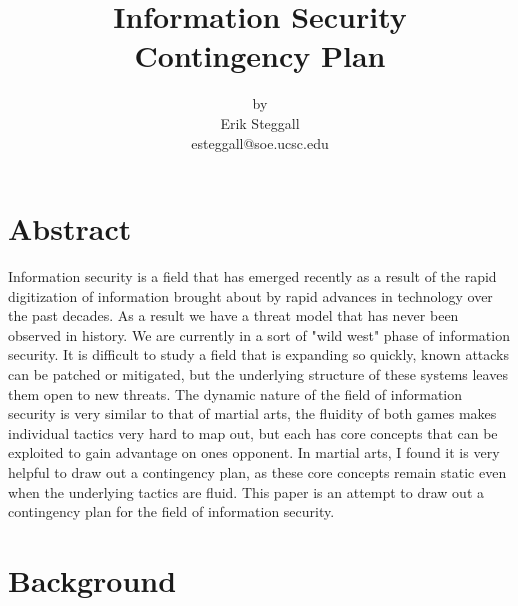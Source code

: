 \documentclass{article}
\title{Information Security\\ Contingency Plan}
\author{by\\ Erik Steggall \\ esteggall@soe.ucsc.edu}
\date{}
\begin{document}
\maketitle
\pagestyle{empty}


\section{Abstract}
Information security is a field that has emerged recently as a result of the rapid digitization of information brought about by rapid advances in technology over the past decades. As a result we have a threat model that has never been observed in history. We are currently in a sort of "wild west" phase of information security. It is difficult to study a field that is expanding so quickly, known attacks can be patched or mitigated, but the underlying structure of these systems leaves them open to new threats. The dynamic nature of the field of information security is very similar to that of martial arts, the fluidity of both games makes individual tactics very hard to map out, but each has core concepts that can be exploited to gain advantage on ones opponent. In martial arts, I found it is very helpful to draw out a contingency plan, as these core concepts remain static even when the underlying tactics are fluid. This paper is an attempt to draw out a contingency plan for the field of information security. \\


\section{Background}
\end{document}
